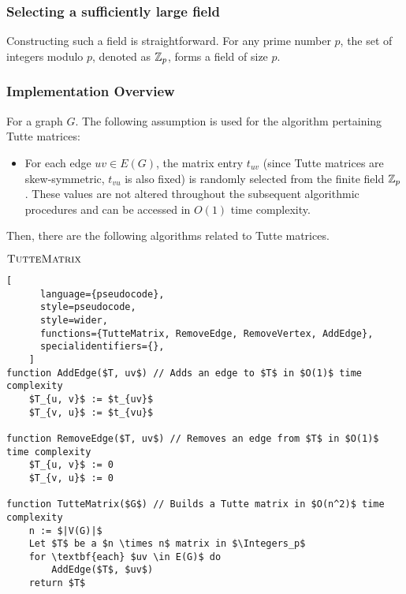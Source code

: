\subsubsection{Selecting a sufficiently large field}
Constructing such a field is straightforward. 
For any prime number \(p\), the set of integers modulo \(p\), denoted as \(\mathbb{Z}_{p}\), forms a field of size \(p\).

\subsubsection{Implementation Overview}

For a graph \(G\). The following assumption is used for the algorithm pertaining Tutte matrices:
\begin{itemize}
    \item For each edge \(uv \in E(G)\), the matrix entry \(t_{uv}\) (since Tutte matrices are skew-symmetric, \(t_{vu}\) is also fixed) is randomly selected from the finite field \(\mathbb{Z}_p\). 
    These values are not altered throughout the subsequent algorithmic procedures and can be accessed in $O(1)$ time complexity.
\end{itemize}
Then, there are the following algorithms related to Tutte matrices.

\begin{programruledcaption}{\(\textsc{TutteMatrix}\)}
    \label{alg:tuttematrix}
    \begin{lstlisting}[
      language={pseudocode},
      style=pseudocode,
      style=wider,
      functions={TutteMatrix, RemoveEdge, RemoveVertex, AddEdge},
      specialidentifiers={},
    ]
function AddEdge($T, uv$) // Adds an edge to $T$ in $O(1)$ time complexity
    $T_{u, v}$ := $t_{uv}$
    $T_{v, u}$ := $t_{vu}$

function RemoveEdge($T, uv$) // Removes an edge from $T$ in $O(1)$ time complexity
    $T_{u, v}$ := 0
    $T_{v, u}$ := 0

function TutteMatrix($G$) // Builds a Tutte matrix in $O(n^2)$ time complexity
    n := $|V(G)|$
    Let $T$ be a $n \times n$ matrix in $\Integers_p$
    for \textbf{each} $uv \in E(G)$ do
        AddEdge($T$, $uv$)
    return $T$
    \end{lstlisting}
\end{programruledcaption}

